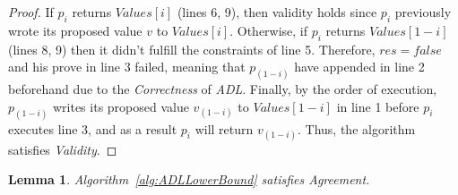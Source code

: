 \documentclass[11pt]{article}
\newtheorem{lemma}{Lemma}
\theoremstyle{definition}
\begin{document}
\begin{proof}
If $p_i$ returns $Values[i]$ (lines 6, 9), then validity holds since $p_i$ previously wrote its proposed value $v$ to $Values[i]$. Otherwise, if $p_i$ returns $Values[1-i]$ (lines 8, 9) then it didn't fulfill the constraints of line 5. Therefore, $res=false$ and his prove in line 3 failed, meaning that $p_{(1-i)}$ have appended in line 2 beforehand due to the \textit{Correctness} of \textit{ADL}. Finally, by the order of execution, $p_{(1-i)}$ writes its proposed value $v_{(1-i)}$ to $Values[1-i]$ in line 1 before $p_i$ executes line 3, and as a result $p_i$ will return $v_{(1-i)}$. Thus, the algorithm satisfies \textit{Validity}.
\end{proof}

\begin{lemma}
  Algorithm~\ref{alg:ADLLowerBound} satisfies Agreement.
\end{lemma}
\end{document}
